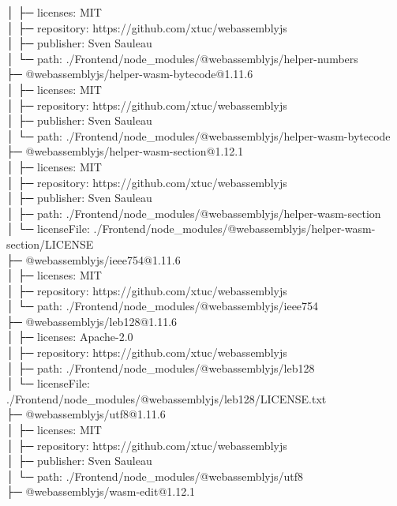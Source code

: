 │  ├─ licenses: MIT\\
│  ├─ repository: https://github.com/xtuc/webassemblyjs\\
│  ├─ publisher: Sven Sauleau\\
│  └─ path: ./Frontend/node\_modules/@webassemblyjs/helper-numbers\\
├─ @webassemblyjs/helper-wasm-bytecode@1.11.6\\
│  ├─ licenses: MIT\\
│  ├─ repository: https://github.com/xtuc/webassemblyjs\\
│  ├─ publisher: Sven Sauleau\\
│  └─ path: ./Frontend/node\_modules/@webassemblyjs/helper-wasm-bytecode\\
├─ @webassemblyjs/helper-wasm-section@1.12.1\\
│  ├─ licenses: MIT\\
│  ├─ repository: https://github.com/xtuc/webassemblyjs\\
│  ├─ publisher: Sven Sauleau\\
│  ├─ path: ./Frontend/node\_modules/@webassemblyjs/helper-wasm-section\\
│  └─ licenseFile: ./Frontend/node\_modules/@webassemblyjs/helper-wasm-section/LICENSE\\
├─ @webassemblyjs/ieee754@1.11.6\\
│  ├─ licenses: MIT\\
│  ├─ repository: https://github.com/xtuc/webassemblyjs\\
│  └─ path: ./Frontend/node\_modules/@webassemblyjs/ieee754\\
├─ @webassemblyjs/leb128@1.11.6\\
│  ├─ licenses: Apache-2.0\\
│  ├─ repository: https://github.com/xtuc/webassemblyjs\\
│  ├─ path: ./Frontend/node\_modules/@webassemblyjs/leb128\\
│  └─ licenseFile: ./Frontend/node\_modules/@webassemblyjs/leb128/LICENSE.txt\\
├─ @webassemblyjs/utf8@1.11.6\\
│  ├─ licenses: MIT\\
│  ├─ repository: https://github.com/xtuc/webassemblyjs\\
│  ├─ publisher: Sven Sauleau\\
│  └─ path: ./Frontend/node\_modules/@webassemblyjs/utf8\\
├─ @webassemblyjs/wasm-edit@1.12.1\\
